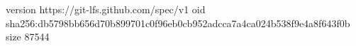 version https://git-lfs.github.com/spec/v1
oid sha256:db5798bb656d70b899701c0f96eb0cb952adcca7a4ca024b538f9e4a8f643f0b
size 87544
